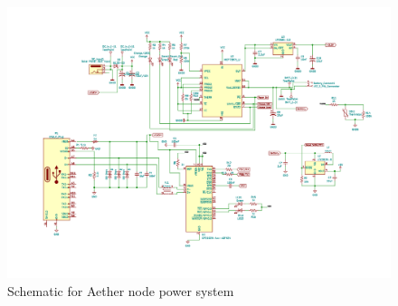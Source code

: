 \begin{figure}
    \centering
    \includegraphics[scale=0.5]{figures/Power_Schematic.jpg}
    \caption{Schematic for Aether node power system}
    \label{fig:power_schematic} 
\end{figure}
